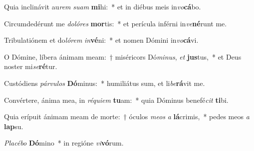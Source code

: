 \item Quia inclinávit au\textit{rem} \textit{su}\textit{am} \textbf{mi}hi:~* et in diébus meis in\textit{vo}\textbf{cá}bo.
\item Circumdedérunt me \textit{do}\textit{ló}\textit{res} \textbf{mor}tis:~* et perícula inférni in\textit{ve}\textbf{né}runt me.
\item Tribulatiónem et do\textit{ló}\textit{rem} \textit{in}\textbf{vé}ni:~* et nomen Dómini in\textit{vo}\textbf{cá}vi.
\item O Dómine, líbera ánimam meam:~† miséricors Dó\textit{mi}\textit{nus}, \textit{et} \textbf{jus}tus,~* et Deus noster mi\textit{se}\textbf{ré}tur.
\item Custódiens \textit{pár}\textit{vu}\textit{los} \textbf{Dó}minus:~* humiliátus sum, et li\textit{be}\textbf{rá}vit me.
\item Convértere, ánima mea, in \textit{ré}\textit{qui}\textit{em} \textbf{tu}am:~* quia Dóminus benefé\textit{cit} \textbf{ti}bi.
\item Quia erípuit ánimam meam de morte:~† óculos \textit{me}\textit{os} \textit{a} \textbf{lá}crimis,~* pedes meos \textit{a} \textbf{lap}su.
\item \textit{Pla}\textit{cé}\textit{bo} \textbf{Dó}mino~* in regióne \textit{vi}\textbf{vó}rum.
